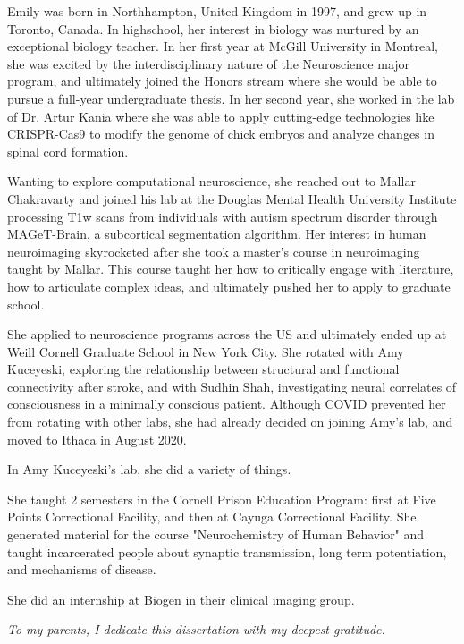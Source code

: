 \documentclass[phd,tocprelim]{cornell}
\begin{document}
\begin{biosketch}
Emily was born in Northhampton, United Kingdom in 1997, and grew up in Toronto, Canada.  In highschool, her interest in biology was nurtured  by an exceptional biology teacher.  In her first year at McGill University in Montreal, she was excited by the interdisciplinary nature of the Neuroscience major program, and ultimately joined the Honors stream where she would be able to pursue a full-year undergraduate thesis. 
In her second year, she worked in the lab of Dr. Artur Kania where she was able to apply cutting-edge technologies like CRISPR-Cas9 to modify the genome of chick embryos and analyze changes in spinal cord formation. 

 Wanting to explore computational neuroscience, she reached out to Mallar Chakravarty and joined his lab at the Douglas Mental Health University Institute processing T1w scans from individuals with autism spectrum disorder through MAGeT-Brain, a subcortical segmentation algorithm.  Her interest in human neuroimaging skyrocketed after she took a master's course in neuroimaging taught by Mallar. This course taught her how to critically engage with literature,  how to articulate complex ideas, and ultimately pushed her to apply to graduate school.

She applied to neuroscience programs across the US and ultimately ended up at Weill Cornell Graduate School in New York City.  She rotated with Amy Kuceyeski, exploring the relationship between structural and functional connectivity after stroke, and with Sudhin Shah,  investigating neural correlates of consciousness in a minimally conscious patient. Although COVID prevented her from rotating with other labs, she had already decided on joining Amy's lab, and moved to Ithaca in August 2020. 

In Amy Kuceyeski's lab,  she did a variety of things.

She taught 2 semesters in the Cornell Prison Education Program: first at Five Points Correctional Facility, and then at Cayuga Correctional Facility. She generated material for the course "Neurochemistry of Human Behavior" and taught incarcerated people about synaptic transmission, long term potentiation,  and mechanisms of disease. 

She did an internship at Biogen in their clinical imaging group.

\end{biosketch}

\begin{dedication}
\textit{To my parents, I dedicate this dissertation with my deepest gratitude. }

\end{dedication}
\end{document}
